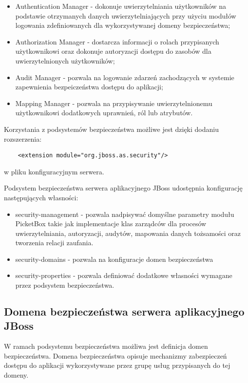 		\begin{itemize}
			\item Authentication Manager - dokonuje uwierzytelniania użytkowników na podstawie otrzymanych danych uwierzytelniających przy użyciu modułów logowania zdefiniowanych dla wykorzystywanej domeny bezpieczeństwa;
			\item Authorization Manager - dostarcza informacji o rolach przypisanych użytkownikowi oraz dokonuje autoryzacji dostępu do zasobów dla uwierzytelnionych użytkowników;
			\item Audit Manager - pozwala na logowanie zdarzeń zachodzących w systemie zapewnienia bezpeiczeństwa dostępu do aplikacji;
			\item Mapping Manager - pozwala na przypisywanie uwierzytelnionemu użytkownikowi dodatkowych uprawnień, ról lub atrybutów.
		\end{itemize}

		Korzystania z podsystemów bezpieczeństwa możliwe jest dzięki dodaniu rozszerzenia:
		\lstset{language=XML}
		\begin{lstlisting}
	<extension module="org.jboss.as.security"/>
		\end{lstlisting}
		w pliku konfiguracyjnym serwera.

		Podsystem bezpieczeństwa serwera aplikacyjnego JBoss udostępnia konfigurację następujących własności:

		\begin{itemize}
			\item security-management - pozwala nadpisywać domyślne parametry modułu PicketBox takie jak implementacje klas zarządców dla procesów uwierzytelniania, autoryzacji, audytów, mapowania danych tożsamości oraz tworzenia relacji zaufania.
			\item security-domains - pozwala na konfiguracje domen bezpieczeństwa
			\item security-properties - pozwala definiować dodatkowe własności wymagane przez podsystem bezpieczeństwa.
		\end{itemize}

	\subsection{Domena bezpieczeństwa serwera aplikacyjnego JBoss}

		W ramach podsystemu bezpieczeństwa możliwa jest definicja domen bezpieczeństwa. Domena bezpieczeństwa opisuje mechanizmy zabezpieczeń dostępu do aplikacji wykorzystywane przez grupę usług przypisanych do tej domeny.

